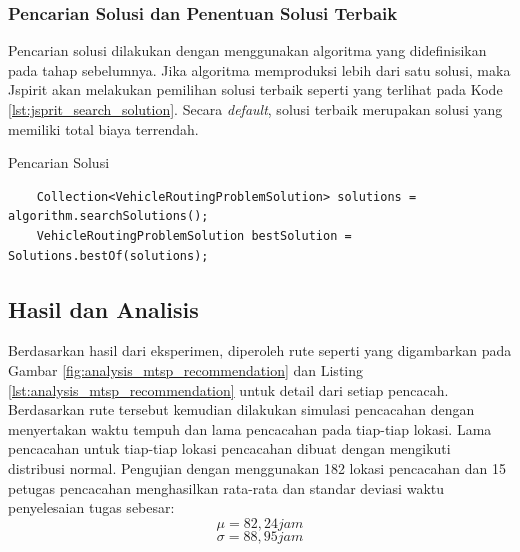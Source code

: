 \subsubsection{Pencarian Solusi dan Penentuan Solusi Terbaik}
Pencarian solusi dilakukan dengan menggunakan algoritma yang didefinisikan pada tahap sebelumnya. Jika algoritma memproduksi lebih dari satu solusi, maka Jspirit akan melakukan pemilihan solusi terbaik seperti yang terlihat pada Kode \ref{lst:jsprit_search_solution}. Secara \textit{default}, solusi terbaik merupakan solusi yang memiliki total biaya terrendah.


\begin{listing}[!]
	\caption{Pencarian Solusi}
	\label{lst:jsprit_search_solution}
	\begin{verbatim}
	Collection<VehicleRoutingProblemSolution> solutions = algorithm.searchSolutions();
	VehicleRoutingProblemSolution bestSolution = Solutions.bestOf(solutions);
	\end{verbatim}
\end{listing}


\subsection{Hasil dan Analisis}
\label{ssec:hasil-analisis}
Berdasarkan hasil dari eksperimen, diperoleh rute seperti yang digambarkan pada Gambar \ref{fig:analysis_mtsp_recommendation} dan Listing \ref{lst:analysis_mtsp_recommendation} untuk detail dari setiap pencacah. Berdasarkan rute tersebut kemudian dilakukan simulasi pencacahan dengan menyertakan waktu tempuh dan lama pencacahan pada tiap-tiap lokasi. Lama pencacahan untuk tiap-tiap lokasi pencacahan dibuat dengan mengikuti distribusi normal. Pengujian dengan menggunakan 182 lokasi pencacahan dan 15 petugas pencacahan menghasilkan rata-rata dan standar deviasi waktu penyelesaian tugas sebesar:  
$$ \mu = 82,24 jam $$
$$ \sigma = 88,95 jam $$


